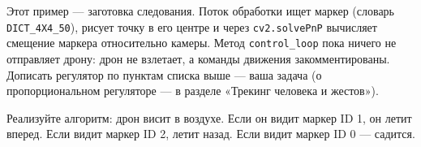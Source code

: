 Этот пример --- заготовка следования. Поток обработки ищет маркер (словарь \texttt{DICT\_4X4\_50}), рисует точку в его центре и через \texttt{cv2.solvePnP} вычисляет смещение маркера относительно камеры. Метод \texttt{control\_loop} пока ничего не отправляет дрону: дрон не взлетает, а команды движения закомментированы. Дописать регулятор по пунктам списка выше --- ваша задача (о пропорциональном регуляторе --- в разделе «Трекинг человека и жестов»).

\begin{taskbox}
Реализуйте алгоритм: дрон висит в воздухе. Если он видит маркер ID 1, он летит вперед. Если видит маркер ID 2, летит назад. Если видит маркер ID 0 — садится.
\end{taskbox}
